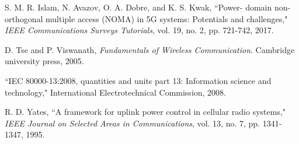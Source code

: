 \documentclass[10pt,journal,final,finalsubmission,twocolumn]{IEEEtran}
\begin{document}
\begin{thebibliography}{99}
 S. M. R. Islam, N. Avazov, O. A. Dobre, and K. S. Kwak, ``Power- domain non-orthogonal multiple access (NOMA) in 5G systems: Potentials and challenges," {\em IEEE Communications Surveys Tutorials}, vol. 19, no. 2, pp. 721-742, 2017.

 D. Tse and P. Viswanath, {\em Fundamentals of Wireless Communication}. Cambridge university press, 2005.

 ``IEC 80000-13:2008, quantities and units part 13: Information science and technology," International Electrotechnical Commission, 2008.

 R. D. Yates, ``A framework for uplink power control in cellular radio
systems," {\em IEEE Journal on Selected Areas in Communications}, vol. 13,
no. 7, pp. 1341-1347, 1995.



\end{thebibliography}
\end{document}
